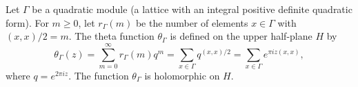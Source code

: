Let $\Gamma$ be a quadratic module (a lattice with an integral positive definite quadratic form). For $m \geq 0$, let $r_\Gamma(m)$ be the number of elements $x \in \Gamma$ with $(x,x)/2 = m$. The theta function $\theta_\Gamma$ is defined on the upper half-plane $H$ by
$$\theta_\Gamma(z) = \sum_{m=0}^{\infty} r_\Gamma(m) q^m = \sum_{x \in \Gamma} q^{(x,x)/2} = \sum_{x \in \Gamma} e^{\pi i z (x,x)},$$
where $q = e^{2\pi iz}$. The function $\theta_\Gamma$ is holomorphic on $H$.
